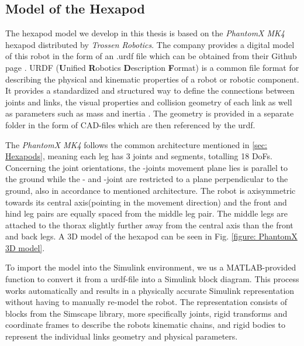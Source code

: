 \subsection{Model of the Hexapod}
The hexapod model we develop in this thesis is based on the \textit{PhantomX MK4} hexapod distributed by \textit{Trossen Robotics}.
The company provides a digital model of this robot in the form of an .urdf file which can be obtained from their Github page \parencite{interboticsGithub}.
URDF (\textbf{U}nified \textbf{R}obotics \textbf{D}escription \textbf{F}ormat) is a common file format for describing the physical and kinematic properties of a robot or robotic component.
It provides a standardized and structured way to define the connections between joints and links, the visual properties and collision geometry of each link as well as parameters such as mass and inertia \parencite{matlabURDFDocumentation}.
The geometry is provided in a separate folder in the form of CAD-files which are then referenced by the urdf.

The \textit{PhantomX MK4} follows the common architecture mentioned in \ref{sec: Hexapods}, meaning each leg has 3 joints and segments, totalling 18 DoFs.
Concerning the joint orientations, the \textalpha-joints movement plane lies is parallel to the ground while the \textbeta- and \textgamma-joint are restricted to a plane perpendicular to the ground, also in accordance to mentioned architecture.
The robot is axisymmetric towards its central axis(pointing in the movement direction) and the front and hind leg pairs are equally spaced from the middle leg pair.
The middle legs are attached to the thorax slightly further away from the central axis than the front and back legs.
A 3D model of the hexapod can be seen in Fig. \ref{figure: PhantomX 3D model}.

To import the model into the Simulink environment, we us a MATLAB-provided function to convert it from a urdf-file into a Simulink block diagram.
This process works automatically and results in a physically accurate Simulink representation without having to manually re-model the robot.
The representation consists of blocks from the Simscape library, more specifically joints, rigid transforms and coordinate frames to describe the robots kinematic chains, and rigid bodies to represent the individual links geometry and physical parameters.

